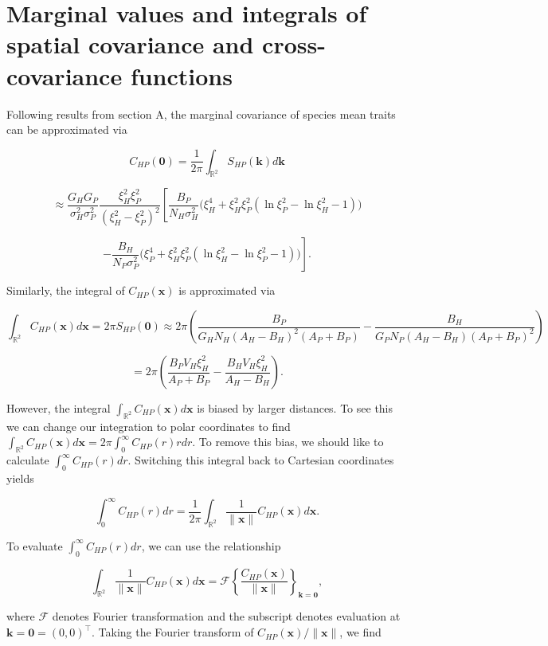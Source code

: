 \documentclass{article}
\begin{document}
\hypertarget{marginal-values-and-integrals-of-spatial-covariance-and-cross-covariance-functions}{%
\section{Marginal values and integrals of spatial covariance and
cross-covariance
functions}\label{marginal-values-and-integrals-of-spatial-covariance-and-cross-covariance-functions}}

Following results from section A, the marginal covariance of species
mean traits can be approximated via

\[C_{HP}(\pmb 0)=\frac{1}{2\pi}\int_{\mathbb R^2}S_{HP}(\pmb k)d\pmb k\]

\[\approx \frac{G_HG_P}{\sigma_H^2\sigma_P^2}\frac{\xi_H^2\xi_P^2}{(\xi_H^2-\xi_P^2)^2}\left[\frac{B_P}{N_H\sigma_H^2}\Big(\xi_H^4+\xi_H^2\xi_P^2(\ln\xi_P^2-\ln\xi_H^2-1)\Big)\right.\]

\[\left.-\frac{B_H}{N_P\sigma_P^2}\Big(\xi_P^4+\xi_H^2\xi_P^2(\ln\xi_H^2-\ln\xi_P^2-1)\Big)\right].\]

Similarly, the integral of \(C_{HP}(\pmb x)\) is approximated via

\[\int_{\mathbb R^2}C_{HP}(\pmb x)d\pmb x=2\pi S_{HP}(\pmb 0)\approx2\pi \left(\frac{B_P}{G_HN_H(A_H-B_H)^2(A_P+B_P)}-\frac{B_H}{G_PN_P(A_H-B_H)(A_P+B_P)^2}\right)\]

\[=2\pi\left(\frac{B_PV_H\xi_H^2}{A_P+B_P}-\frac{B_HV_H\xi_H^2}{A_H-B_H}\right).\]

However, the integral \(\int_{\mathbb R^2}C_{HP}(\pmb x)d\pmb x\) is
biased by larger distances. To see this we can change our integration to
polar coordinates to find
\(\int_{\mathbb R^2}C_{HP}(\pmb x)d\pmb x=2\pi\int_0^\infty C_{HP}(r)rdr\).
To remove this bias, we should like to calculate
\(\int_0^\infty C_{HP}(r)dr\). Switching this integral back to Cartesian
coordinates yields

\[\int_0^\infty C_{HP}(r)dr=\frac{1}{2\pi}\int_{\mathbb R^2}\frac{1}{\|\pmb x\|}C_{HP}(\pmb x)d\pmb x.\]

To evaluate \(\int_0^\infty C_{HP}(r)dr\), we can use the relationship

\[\int_{\mathbb R^2}\frac{1}{\|\pmb x\|}C_{HP}(\pmb x)d\pmb x=\mathcal F\left\{\frac{C_{HP}(\pmb x)}{\|\pmb x\|}\right\}_{\pmb k=\pmb 0},\]

where \(\mathcal F\) denotes Fourier transformation and the subscript
denotes evaluation at \(\pmb k=\pmb 0=(0,0)^\top\). Taking the Fourier
transform of \(C_{HP}(\pmb x)/\|\pmb x\|\), we find
\end{document}
